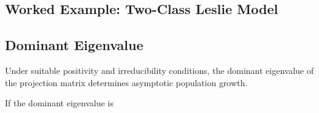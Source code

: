 \subsection{Worked Example: Two-Class Leslie Model}
\label{subsec:worked-leslie-model}


\subsection{Dominant Eigenvalue}
\label{subsec:leslie-dominant-eigenvalue}

Under suitable positivity and irreducibility conditions, the dominant
eigenvalue of the projection matrix determines asymptotic population growth.

If the dominant eigenvalue is

